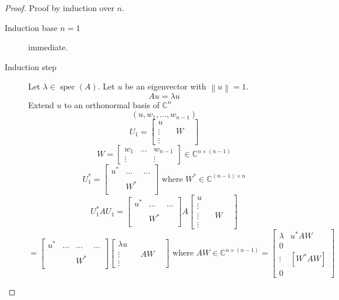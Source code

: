 \documentclass{article}
\numberwithin{lecref}{section}
\newcommand{\norm}[1]{\left\|#1\right\|}
\begin{document}
\begin{proof}
  Proof by induction over $n$.
  \begin{description}
    \item[Induction base $n=1$] immediate.
    \item[Induction step]
      Let $\lambda \in \operatorname{spec}(A)$. Let $u$ be an eigenvector with $\norm{u} = 1$.
      \[ Au = \lambda u \]
      Extend $u$ to an orthonormal basis of $\mathbb C^n$
      \[ (u, w_1, \dots, w_{n-1}) \]
      \[ U_1 = \begin{bmatrix} u & & & \\ \vdots & & W & \\ \vdots & & & \end{bmatrix} \]
      \[ W = \begin{bmatrix} w_1 & \dots & w_{n-1} \\ \vdots &  & \vdots \end{bmatrix} \in \mathbb C^{n \times (n-1)} \]
      \[ U_1^* = \begin{bmatrix} u^* & \dots & \dots \\ & & \\ & W^* & \\ & & \end{bmatrix} \text{ where } W^* \in \mathbb C^{(n-1) \times n} \]
      \[ U_1^* AU_1 = \begin{bmatrix} u^* & \dots & \dots \\ & & \\ & W^* & \\ & & \end{bmatrix} A \begin{bmatrix} u & & & \\ \vdots & & & \\ \vdots & & W & \\ \vdots & & & \end{bmatrix} \]
      \[ = \begin{bmatrix} u^* & \dots & \dots & \dots \\ & & & \\ & & W^* & \\ & & & \end{bmatrix} \begin{bmatrix} \lambda u & & & \\ \vdots & & AW & \\ \vdots & & & \end{bmatrix} \text{ where } AW \in \mathbb C^{n \times (n-1)} = \begin{bmatrix} \lambda & u^* AW \\ 0 & \\ \vdots & [W^* AW] \\ 0 & \end{bmatrix} \]

\end{description}
\end{proof}
\end{document}
